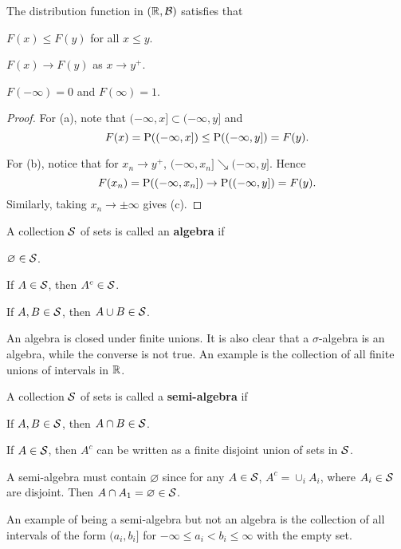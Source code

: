 \begin{proposition}
    The distribution function in $(\R, \B)$ satisfies that 
    \begin{thmenum}
        \item $F(x)\leq F(y)$ for all $x\leq y$. 
        \item $F(x)\to F(y)$ as $x\to y^+$. 
        \item $F(-\infty) = 0$ and $F(\infty) = 1$. 
    \end{thmenum}
\end{proposition}
\begin{proof}
    For (a), note that $(-\infty, x]\subset(-\infty, y]$ and 
    \begin{equation*}
        F(x) = \P((-\infty, x]) \leq \P((-\infty, y]) = F(y). 
    \end{equation*}

    For (b), notice that for $x_n\to y^+$, $(-\infty, x_n]\searrow(-\infty, y]$. 
    Hence 
    \begin{equation*}
        F(x_n) = \P((-\infty, x_n]) \to \P((-\infty, y]) = F(y). 
    \end{equation*}
    Similarly, taking $x_n\to\pm\infty$ gives (c). 
\end{proof}

\begin{definition}
    A collection $\S$ of sets is called an \textbf{algebra} if 
    \begin{thmenum}
        \item $\varnothing\in\S$. 
        \item If $A\in\S$, then $A^c\in\S$. 
        \item If $A, B\in\S$, then $A\cup B\in\S$. 
    \end{thmenum}
\end{definition}
\begin{remark}
    An algebra is closed under finite unions. It is also 
    clear that a $\sigma$-algebra is an algebra, while the 
    converse is not true. An example is the collection of 
    all finite unions of intervals in $\R$. 
\end{remark}

\begin{definition}
    A collection $\S$ of sets is called a \textbf{semi-algebra} if 
    \begin{thmenum} 
        \item If $A, B\in\S$, then $A\cap B\in\S$.
        \item If $A\in\S$, then $A^c$ can be written as a finite disjoint union of sets in $\S$.
    \end{thmenum}
\end{definition}
\begin{remark}
    A semi-algebra must contain $\varnothing$ since for any 
    $A\in\S$, $A^c = \cup_i A_i$, where $A_i\in\S$ are disjoint. 
    Then $A\cap A_1 = \varnothing\in\S$.
\end{remark}
\begin{remark}
    An example of being a semi-algebra but not an algebra is the 
    collection of all intervals of the form $(a_i, b_i]$ for $-\infty\leq a_i<b_i\leq\infty$ 
    with the empty set.
\end{remark}

